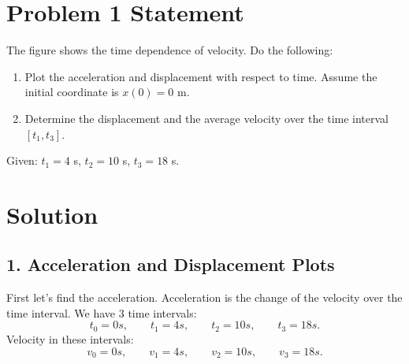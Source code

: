 \documentclass{article}
\begin{document}


\section*{Problem 1 Statement}
The figure shows the time dependence of velocity. Do the following:

\begin{enumerate}
    \item Plot the acceleration and displacement with respect to time. Assume the initial coordinate is $x(0) = 0$ m.
    \item Determine the displacement and the average velocity over the time interval $[t_1, t_3]$.
\end{enumerate}

Given: $t_1 = 4$ s, $t_2 = 10$ s, $t_3 = 18$ s.

\section*{Solution}

\subsection*{1. Acceleration and Displacement Plots}
First let's find the acceleration. Acceleration is the change of the velocity over the time interval.
We have 3 time intervals: 
\[
t_0 = 0s, \qquad t_1 = 4s, \qquad t_2 = 10s, \qquad t_3 = 18s.
\]
Velocity in these intervals:
\[
v_0 = 0s, \qquad v_1 = 4s, \qquad v_2 = 10s, \qquad v_3 = 18s.
\]
\end{document}

